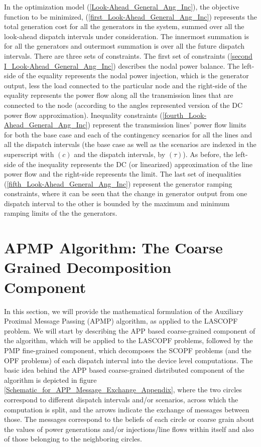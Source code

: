 \documentclass[preprint,12pt,3p]{elsarticle}
\begin{document}
In the optimization model (\ref{Look-Ahead_General_Ang_Inc}), the objective function to be minimized, (\ref{first_Look-Ahead_General_Ang_Inc}) represents the total generation cost for all the generators in the system, summed over all the look-ahead dispatch intervals under consideration. The innermost summation is for all the generators and outermost summation is over all the future dispatch intervals. There are three sets of constraints. The first set of constraints (\ref{second I_Look-Ahead_General_Ang_Inc}) describes the nodal power balance. The left-side of the equality represents the nodal power injection, which is the generator output, less the load connected to the particular node and the right-side of the equality represents the power flow along all the transmission lines that are connected to the node (according to the angles represented version of the DC power flow approximation). Inequality constraints (\ref{fourth_Look-Ahead_General_Ang_Inc}) represent the transmission lines' power flow limits for both the base case and each of the contingency scenarios for all the lines and all the dispatch intervals (the base case as well as the scenarios are indexed in the superscript with $(c)$ and the dispatch intervals, by $(\tau)$). As before, the left-side of the inequality represents the DC (or linearized) approximation of the line power flow and the right-side represents the limit. The last set of inequalities (\ref{fifth_Look-Ahead_General_Ang_Inc}) represent the generator ramping constraints, where it can be seen that the change in generator output from one dispatch interval to the other is bounded by the maximum and minimum ramping limits of the the generators.
\section{APMP Algorithm: The Coarse Grained Decomposition Component}
\label{APMPAlgo}
In this section, we will provide the mathematical formulation of the Auxiliary Proximal Message Passing (APMP) algorithm, as applied to the LASCOPF problem. We will start by describing the APP based coarse-grained component of the algorithm, which will be applied to the LASCOPF problems, followed by the PMP fine-grained component, which decomposes the SCOPF problems (and the OPF problems) of each dispatch interval into the device level computations. The basic idea behind the APP based coarse-grained distributed component of the algorithm is depicted in figure \ref{Schematic_for_APP_Message_Exchange_Appendix}, where the two circles correspond to different dispatch intervals and/or scenarios, across which the computation is split, and the arrows indicate the exchange of messages between those. The messages correspond to the beliefs of each circle or coarse grain about the values of power generations and/or injections/line flows within itself and also of those belonging to the neighboring circles.
\end{document}
